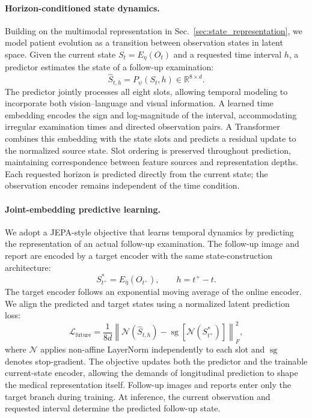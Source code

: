 \paragraph{Horizon-conditioned state dynamics.}
Building on the multimodal representation in Sec.~\ref{sec:state_representation}, we model patient evolution as a transition between observation states in latent space. Given the current state $S_t=E_\eta(O_t)$ and a requested time interval $h$, a predictor estimates the state of a follow-up examination:
\begin{equation}
    \widehat S_{t,h}
    =P_\psi(S_t,h)
    \in\mathbb{R}^{8\times d}.
    \label{eq:state_transition}
\end{equation}
The predictor jointly processes all eight slots, allowing temporal modeling to incorporate both vision--language and visual information. A learned time embedding encodes the sign and log-magnitude of the interval, accommodating irregular examination times and directed observation pairs. A Transformer combines this embedding with the state slots and predicts a residual update to the normalized source state. Slot ordering is preserved throughout prediction, maintaining correspondence between feature sources and representation depths. Each requested horizon is predicted directly from the current state; the observation encoder remains independent of the time condition.

\paragraph{Joint-embedding predictive learning.}
We adopt a JEPA-style objective that learns temporal dynamics by predicting the representation of an actual follow-up examination. The follow-up image and report are encoded by a target encoder with the same state-construction architecture:
\begin{equation}
    S_{t^+}^{*}=E_{\bar\eta}(O_{t^+}),
    \qquad h=t^+-t.
    \label{eq:followup_target}
\end{equation}
The target encoder follows an exponential moving average of the online encoder. We align the predicted and target states using a normalized latent prediction loss:
\begin{equation}
    \mathcal L_{\mathrm{future}}
    =\frac{1}{8d}
    \left\|
    \mathcal N(\widehat S_{t,h})
    -\operatorname{sg}\!\left[\mathcal N(S_{t^+}^{*})\right]
    \right\|_F^2,
    \label{eq:future_latent_loss}
\end{equation}
where $\mathcal N$ applies non-affine LayerNorm independently to each slot and $\operatorname{sg}$ denotes stop-gradient. The objective updates both the predictor and the trainable current-state encoder, allowing the demands of longitudinal prediction to shape the medical representation itself. Follow-up images and reports enter only the target branch during training. At inference, the current observation and requested interval determine the predicted follow-up state.

